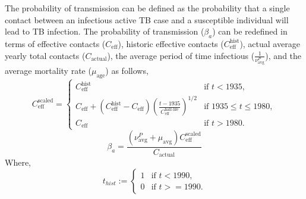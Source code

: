 \documentclass[11pt,twoside]{bristolthesis}
\begin{document}
  The probability of transmission can be defined as the probability that a single contact between an infectious active TB case and a susceptible individual will lead to TB infection. The probability of transmission (\(\beta_a\)) can be redefined in terms of effective contacts (\(C_{\text{eff}}\)), historic effective contacts (\(C^{\text{hist}}_{\text{eff}}\)), actual average yearly total contacts (\(C_{\text{actual}}\)), the average period of time infectious (\(\frac{1}{\nu_{\text{avg}}^{P}}\)), and the average mortality rate (\(\mu_{\text{age}}\)) as follows,
  \begin{equation}
  C^{\text{scaled}}_{\text{eff}} = \begin{cases}
  C^{\text{hist}}_{\text{eff}} & \text{if } t < 1935, \\
  C_{\text{eff}} + \left(C^{\text{hist}}_{\text{eff}} -  C_{\text{eff}} \right) \left(\frac{t-1935}{C^{\text{half-life}}_{\text{eff}}}\right)^{1/2} & \text{if } 1935 \leq t \leq 1980, \\
  C_{\text{eff}} & \text{if } t > 1980. \end{cases}
    \label{eq:scaled-contacts}
  \end{equation}
  \begin{equation}
  \beta_a = \frac{(\nu_{\text{avg}}^{P} + \mu_{\text{avg}}) C^{\text{scaled}}_{\text{eff}}}{C_{\text{actual}}}
  \label{eq:beta-eq}
  \end{equation}
  Where,
  \begin{equation}
  t_{hist}  := \begin{cases}
  1 & \text{if } t < 1990, \\
  0 & \text{if } t >= 1990. \end{cases}
  \end{equation}
\end{document}
